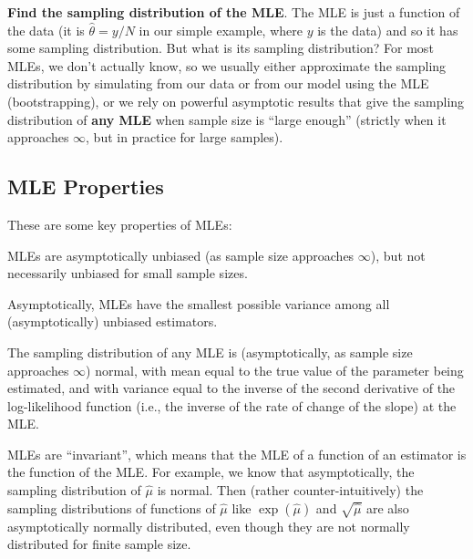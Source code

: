 \item \textbf{Find the sampling distribution of the MLE}. The MLE is just a function of the data (it is $\hat{\theta}=y/N$ in our simple example, where $y$ is the data) and so it has some sampling distribution. But what is its sampling distribution? For most MLEs, we don't actually know, so we usually either approximate the sampling distribution by simulating from our data or from our model using the MLE (bootstrapping), or we rely on powerful asymptotic results that give the sampling distribution of \textbf{any MLE} when sample size is ``large enough'' (strictly when it approaches $\infty$, but in practice for large samples). 

\een


\subsection{MLE Properties}

These are some key properties of MLEs:

\bi

\item MLEs are asymptotically unbiased (as sample size approaches $\infty$), but not necessarily unbiased for small sample sizes.

\item Asymptotically, MLEs have the smallest possible variance among all (asymptotically) unbiased estimators.

\item The sampling distribution of any MLE is (asymptotically, as sample size approaches $\infty$) normal, with mean equal to the true value of the parameter being estimated, and with variance equal to the inverse of the second derivative of the log-likelihood function (i.e., the inverse of the rate of change of the slope) at the MLE.

\item MLEs are ``invariant'', which means that the MLE of a function of an estimator is the function of the MLE. For example, we know that asymptotically, the sampling distribution of $\hat{\mu}$ is normal. Then (rather counter-intuitively) the sampling distributions of functions of $\hat{\mu}$ like $\exp(\hat{\mu})$ and $\sqrt{\hat{\mu}}$ are also asymptotically normally distributed, even though they are not normally distributed for finite sample size.
\ei

